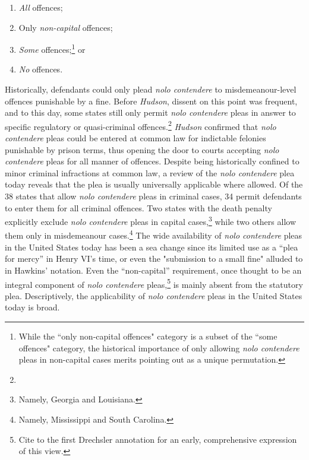 \begin{enumerate}
\item \textit{All} offences;
\item Only \textit{non-capital} offences;
\item \textit{Some} offences;\footnote{While the ``only non-capital offences" category is a subset of the ``some offences" category, the historical importance of only allowing \textit{nolo contendere} pleas in non-capital cases merits pointing out as a unique permutation.} or
\item \textit{No} offences.%
\end{enumerate}

Historically, defendants could only plead \textit{nolo contendere} to misdemeanour-level offences punishable by a fine. Before \textit{Hudson}, dissent on this point was frequent, and to this day, some states still only permit \textit{nolo contendere} pleas in answer to specific regulatory or quasi-criminal offences.\footnote{} \textit{Hudson} confirmed that \textit{nolo contendere} pleas could be entered at common law for indictable felonies punishable by prison terms, thus opening the door to courts accepting \textit{nolo contendere} pleas for all manner of offences. Despite being historically confined to minor criminal infractions at common law, a review of the \textit{nolo contendere} plea today reveals that the plea is usually universally applicable where allowed. Of the 38 states that allow \textit{nolo contendere} pleas in criminal cases, 34 permit defendants to enter them for all criminal offences. Two states with the death penalty explicitly exclude \textit{nolo contendere} pleas in capital cases,\footnote{Namely, Georgia and Louisiana.} while two others allow them only in misdemeanour cases.\footnote{Namely, Mississippi and South Carolina.} The wide availability of \textit{nolo contendere} pleas in the United States today has been a sea change since its limited use as a ``plea for mercy'' in Henry VI's time, or even the "submission to a small fine" alluded to in Hawkins' notation. Even the ``non-capital'' requirement, once thought to be an integral component of \textit{nolo contendere} pleas,\footnote{Cite to the first Drechsler annotation for an early, comprehensive expression of this view.} is mainly absent from the statutory plea. Descriptively, the applicability of \textit{nolo contendere} pleas in the United States today is broad.

